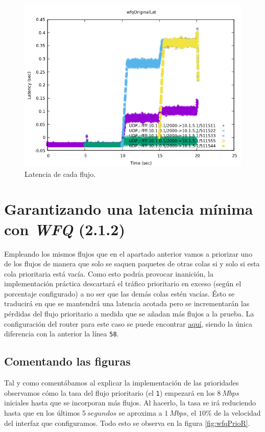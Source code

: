 \documentclass[11pt]{article}
\begin{document}
            \begin{figure}
                \centering
                \includegraphics[width=0.6\linewidth]{wfqOriginalLat.png}
                \caption{Latencia de cada flujo.}
                \label{fig:wfqOriginalLat}
            \end{figure}

    \section{Garantizando una latencia mínima con \textit{WFQ} (2.1.2)}
        Empleando los mismos flujos que en el apartado anterior vamos a priorizar uno de los flujos de manera que solo se saquen paquetes de otras colas si y solo si esta cola prioritaria está vacía. Como esto podría provocar inanición, la implementación práctica descartará el tráfico prioritario en exceso (según el porcentaje configurado) a no ser que las demás colas estén vacías. Ésto se traducirá en que se mantendrá una latencia acotada pero se incrementarán las pérdidas del flujo prioritario a medida que se añadan más flujos a la prueba. La configuración del router para este caso se puede encontrar \href{https://github.com/UAH-s-Telematics-Engineering-Tasks/traff_eng/blob/master/P2/Router_confs/prioWFQ.cfg}{aquí}, siendo la única diferencia con la anterior la línea \texttt{58}.

        \subsection{Comentando las figuras}
            Tal y como comentábamos al explicar la implementación de las prioridades observamos cómo la tasa del flujo prioritario (el \texttt{1}) empezará en los $8\ Mbps$ iniciales hasta que se incorporan más flujos. Al hacerlo, la tasa se irá reduciendo hasta que en los últimos $5\ segundos$ se aproxima a $1\ Mbps$, el $10\%$ de la velocidad del interfaz que configuramos. Todo esto se observa en la figura \ref{fig:wfqPrioR}.\\
\end{document}
